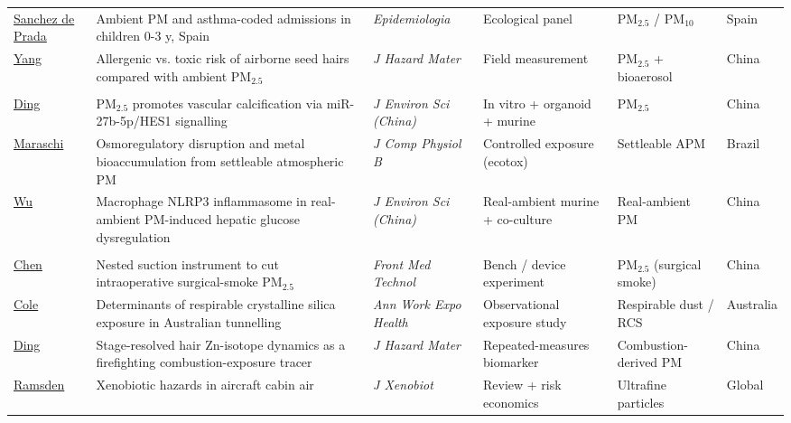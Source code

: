 {\begin{longtable}{@{}>{\RaggedRight}p{25mm}>{\RaggedRight}p{41mm}>{\RaggedRight}p{27mm}%
>{\RaggedRight}p{23mm}>{\RaggedRight}p{18mm}>{\RaggedRight}p{15mm}@{}}
\href{https://doi.org/10.3390/epidemiologia7040097}{Sanchez de Prada} & Ambient PM and asthma-coded admissions in children 0-3 y, Spain & \textit{Epidemiologia} & Ecological panel & PM$_{2.5}$ / PM$_{10}$ & Spain\\
\href{https://doi.org/10.1016/j.jhazmat.2026.143076}{Yang} & Allergenic vs. toxic risk of airborne seed hairs compared with ambient PM$_{2.5}$ & \textit{J Hazard Mater} & Field measurement & PM$_{2.5}$ + bioaerosol & China\\
\addlinespace[0.9mm]
\multicolumn{6}{@{}l@{}}{\cellcolor{Mist}\textsf{\textbf{\textcolor{Violet}{Mechanistic toxicology}}}}\\[0.6mm]
\href{https://doi.org/10.1016/j.jes.2025.12.074}{Ding} & PM$_{2.5}$ promotes vascular calcification via miR-27b-5p/HES1 signalling & \textit{J Environ Sci (China)} & In vitro + organoid + murine & PM$_{2.5}$ & China\\
\href{https://doi.org/10.1007/s00360-026-01698-5}{Maraschi} & Osmoregulatory disruption and metal bioaccumulation from settleable atmospheric PM & \textit{J Comp Physiol B} & Controlled exposure (ecotox) & Settleable APM & Brazil\\
\href{https://doi.org/10.1016/j.jes.2025.11.018}{Wu} & Macrophage NLRP3 inflammasome in real-ambient PM-induced hepatic glucose dysregulation & \textit{J Environ Sci (China)} & Real-ambient murine + co-culture & Real-ambient PM & China\\
\addlinespace[0.9mm]
\multicolumn{6}{@{}l@{}}{\cellcolor{Mist}\textsf{\textbf{\textcolor{Clay}{Occupational \& indoor}}}}\\[0.6mm]
\href{https://doi.org/10.3389/fmedt.2026.1796828}{Chen} & Nested suction instrument to cut intraoperative surgical-smoke PM$_{2.5}$ & \textit{Front Med Technol} & Bench / device experiment & PM$_{2.5}$ (surgical smoke) & China\\
\href{https://doi.org/10.1093/annweh/wxag055}{Cole} & Determinants of respirable crystalline silica exposure in Australian tunnelling & \textit{Ann Work Expo Health} & Observational exposure study & Respirable dust / RCS & Australia\\
\href{https://doi.org/10.1016/j.jhazmat.2026.143081}{Ding} & Stage-resolved hair Zn-isotope dynamics as a firefighting combustion-exposure tracer & \textit{J Hazard Mater} & Repeated-measures biomarker & Combustion-derived PM & China\\
\href{https://doi.org/10.3390/jox16040119}{Ramsden} & Xenobiotic hazards in aircraft cabin air & \textit{J Xenobiot} & Review + risk economics & Ultrafine particles & Global\\

\end{longtable}}
